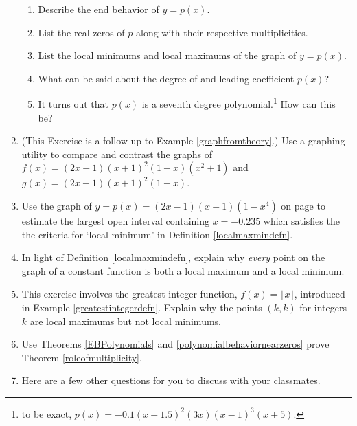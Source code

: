 \begin{enumerate}
\begin{enumerate}

\item  Describe the end behavior of $y = p(x)$.

\item  List the real zeros of $p$ along with their respective multiplicities.  

\item  List the local minimums and local maximums of the graph of $y = p(x)$.

\item  What can be said about the degree of and leading coefficient $p(x)$?

\item  It turns out that $p(x)$ is a seventh degree polynomial.\footnote{to be exact, $p(x) = -0.1\left(x+1.5\right)^2\left(3x\right)\left(x-1\right)^3\left(x+5\right)$.}  How can this be?

\end{enumerate}

\item  \label{comparegraphfromtheoryexample}  (This Exercise is a follow up to Example \ref{graphfromtheory}.)  Use a graphing utility to  compare and contrast the graphs of $f(x) = (2x-1)(x+1)^2(1-x)(x^2+1)$ and $g(x) = (2x-1)(x+1)^2(1-x)$.

\item Use the graph of $y= p(x) = (2x-1)(x+1)(1-x^4)$ on page \pageref{localmaxminexample} to estimate the largest open interval containing $x = -0.235$ which satisfies the the criteria for `local minimum'  in Definition \ref{localmaxmindefn}.

\item  In light of Definition \ref{localmaxmindefn}, explain why \textit{every} point on the graph of a constant function is both a local maximum and a local minimum.

\item This exercise involves the greatest integer function, $f(x) = \lfloor x \rfloor$,  introduced in Example \ref{greatestintegerdefn}.  Explain why the points $(k,k)$ for integers $k$ are local maximums but not local minimums.

\item  Use Theorems  \ref{EBPolynomials}  and \ref{polynomialbehaviornearzeros} prove Theorem \ref{roleofmultiplicity}.


\newpage

\item Here are a few other questions for you to discuss with your classmates.  


\end{enumerate}
